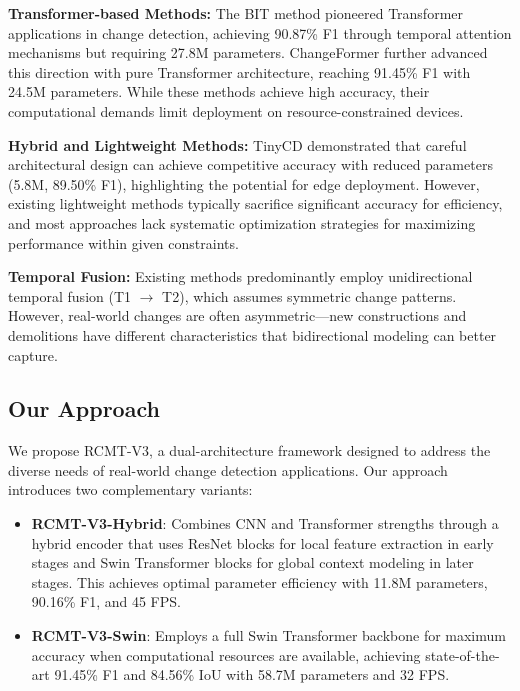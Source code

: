 \documentclass[journal]{IEEEtran}
\begin{document}
\textbf{Transformer-based Methods:} The BIT method \cite{bit} pioneered Transformer applications in change detection, achieving 90.87\% F1 through temporal attention mechanisms but requiring 27.8M parameters. ChangeFormer \cite{changeforemer} further advanced this direction with pure Transformer architecture, reaching 91.45\% F1 with 24.5M parameters. While these methods achieve high accuracy, their computational demands limit deployment on resource-constrained devices.

\textbf{Hybrid and Lightweight Methods:} TinyCD \cite{tinycd} demonstrated that careful architectural design can achieve competitive accuracy with reduced parameters (5.8M, 89.50\% F1), highlighting the potential for edge deployment. However, existing lightweight methods typically sacrifice significant accuracy for efficiency, and most approaches lack systematic optimization strategies for maximizing performance within given constraints.

\textbf{Temporal Fusion:} Existing methods predominantly employ unidirectional temporal fusion (T1 $\rightarrow$ T2), which assumes symmetric change patterns. However, real-world changes are often asymmetric—new constructions and demolitions have different characteristics that bidirectional modeling can better capture.

\subsection{Our Approach}

We propose RCMT-V3, a dual-architecture framework designed to address the diverse needs of real-world change detection applications. Our approach introduces two complementary variants:

\begin{itemize}
\item \textbf{RCMT-V3-Hybrid}: Combines CNN and Transformer strengths through a hybrid encoder that uses ResNet blocks for local feature extraction in early stages and Swin Transformer blocks for global context modeling in later stages. This achieves optimal parameter efficiency with 11.8M parameters, 90.16\% F1, and 45 FPS.

\item \textbf{RCMT-V3-Swin}: Employs a full Swin Transformer backbone for maximum accuracy when computational resources are available, achieving state-of-the-art 91.45\% F1 and 84.56\% IoU with 58.7M parameters and 32 FPS.
\end{itemize}
\end{document}
